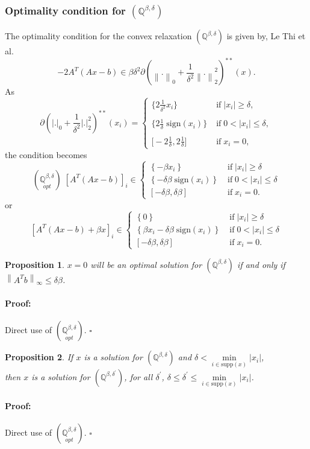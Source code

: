 \documentclass[fleqn]{report} %
\newcommand\ddfrac[2]{\frac{\displaystyle #1}{\displaystyle #2}}
\newtheorem{thm}{Proposition}[subsection]
\newenvironment{proof}{\paragraph{Proof:}}{\hfill$\square$}
\begin{document}
\subsubsection{Optimality condition for $(\mathbb{Q}^{\beta,\delta})$}
The optimality condition for the convex relaxation $(\mathbb{Q}^{\beta,\delta})$ is given by, Le Thi et al.
\[
	-2A^T(Ax-b)\in \beta\delta^2\partial \left(\left\|.\right\|_0 +  \ddfrac{1}{\delta^2} \left\|.\right\|_2^2\right)^{**}(x).
\]
As
\[
\partial\left(\left|.\right|_0 + \ddfrac{1}{\delta^2} \left|.\right|_2^2\right)^{**}(x_i)=\left\{ \begin{array}{ll}
\Bigg\{2\ddfrac{1}{\delta^2}  x_i\Bigg\}&\;\text{if}\; \left|x_i\right|\geq \delta,\\
&\\
\Bigg\{2\ddfrac{1}{\delta} \;\text{sign}(x_i)\Bigg\} &\;\text{if}\; 0<\left|x_i\right|\leq \delta,\\
&\\
\Bigg[-2\ddfrac{1}{\delta} , 2\ddfrac{1}{\delta} \Bigg]&\;\text{if}\; x_i=0,
\end{array}
\right.
\]
the condition becomes
\[
\left(\underset{opt}{\mathbb{Q}^{\beta,\delta}}\right)\;
\left[A^T(Ax-b)\right]_i\in 
\left\{ \begin{array}{ll}
\left\{-\beta x_i\right\}&\;\text{if}\; \left|x_i\right|\geq\delta\\
\left\{-\delta\beta\;\text{sign}(x_i)\right\} &\;\text{if}\; 0<\left|x_i\right|\leq \delta\\
\left[-\delta\beta, \delta\beta\right]&\;\text{if}\; x_i=0.
\end{array}
\right.
\]
or
\[
\left[A^T(Ax-b) +\beta x\right]_i\in 
\left\{ \begin{array}{ll}
\left\{0\right\}&\;\text{if}\; \left|x_i\right|\geq\delta\\
\left\{\beta x_i-\delta\beta\;\text{sign}(x_i)\right\} &\;\text{if}\; 0<\left|x_i\right|\leq \delta\\
\left[-\delta\beta, \delta\beta\right]&\;\text{if}\; x_i=0.
\end{array}
\right.
\]
\begin{thm}
$x=0$ will be an optimal solution for $(\mathbb{Q}^{\beta,\delta})$ if and only if $\left\|A^Tb\right\|_{\infty}\leq\delta\beta $.
\end{thm}
\begin{proof}
    Direct use of $\left(\underset{opt}{\mathbb{Q}^{\beta,\delta}}\right)$.
\end{proof}
\begin{thm}If  $x$ is a solution for $(\mathbb{Q}^{\beta,\delta})$ and $\delta<
\underset{i\in \text{supp}(x)}{\min}\left|x_i\right|$,\\ then $x$ is a solution for $(\mathbb{Q}^{\beta,\delta^{\prime}})$, for all $\delta^{\prime}$, $\delta\leq \delta^{\prime}\leq \underset{i\in \text{supp}(x)}{\min}\left|x_i\right|$.
\end{thm}
\begin{proof}
    Direct use of $\left(\underset{opt}{\mathbb{Q}^{\beta,\delta}}\right)$.
\end{proof}
\end{document}
